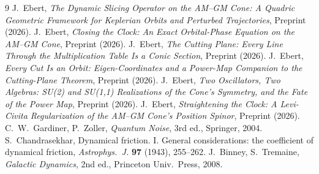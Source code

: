 \documentclass[12pt]{amsart}
\theoremstyle{plain}
\theoremstyle{remark}
\begin{document}
\begin{thebibliography}{9}
 J.~Ebert, \emph{The Dynamic Slicing Operator on the AM--GM Cone: A Quadric Geometric Framework for Keplerian Orbits and Perturbed Trajectories}, Preprint (2026).
 J.~Ebert, \emph{Closing the Clock: An Exact Orbital-Phase Equation on the AM--GM Cone}, Preprint (2026).
 J.~Ebert, \emph{The Cutting Plane: Every Line Through the Multiplication Table Is a Conic Section}, Preprint (2026).
 J.~Ebert, \emph{Every Cut Is an Orbit: Eigen-Coordinates and a Power-Map Companion to the Cutting-Plane Theorem}, Preprint (2026).
 J.~Ebert, \emph{Two Oscillators, Two Algebras: SU(2) and SU(1,1) Realizations of the Cone's Symmetry, and the Fate of the Power Map}, Preprint (2026).
 J.~Ebert, \emph{Straightening the Clock: A Levi-Civita Regularization of the AM--GM Cone's Position Spinor}, Preprint (2026).
 C.~W.~Gardiner, P.~Zoller, \emph{Quantum Noise}, 3rd ed., Springer, 2004.
 S.~Chandrasekhar, Dynamical friction. I. General considerations: the coefficient of dynamical friction, \emph{Astrophys.\ J.} \textbf{97} (1943), 255--262.
 J.~Binney, S.~Tremaine, \emph{Galactic Dynamics}, 2nd ed., Princeton Univ.\ Press, 2008.
\end{thebibliography}
\end{document}
